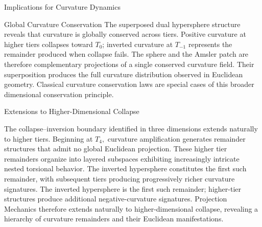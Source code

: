 \documentclass[final,onefignum,onetabnum]{siamart}
\begin{document}
\begin{section}{Implications for Curvature Dynamics}
\begin{subsection}{Global Curvature Conservation}
The superposed dual hypersphere structure reveals that curvature is globally conserved across tiers. Positive curvature at higher tiers collapses toward $T_0$; inverted curvature at $T_{-1}$ represents the remainder produced when collapse fails. The sphere and the Amsler patch are therefore complementary projections of a single conserved curvature field. Their superposition produces the full curvature distribution observed in Euclidean geometry. Classical curvature conservation laws are special cases of this broader dimensional conservation principle.
\end{subsection}

\begin{subsection}{Extensions to Higher-Dimensional Collapse}

The collapse–inversion boundary identified in three dimensions extends naturally to higher tiers. Beginning at $T_4,$ curvature amplification generates remainder structures that admit no global Euclidean projection. These higher tier remainders organize into layered subspaces exhibiting increasingly intricate nested torsional behavior. The inverted hypersphere constitutes the first such remainder, with subsequent tiers producing progressively richer curvature signatures. The inverted hypersphere is the first such remainder; higher-tier structures produce additional negative-curvature signatures. Projection Mechanics therefore extends naturally to higher-dimensional collapse, revealing a hierarchy of curvature remainders and their Euclidean manifestations.
\end{subsection}
\end{section}
\end{document}
